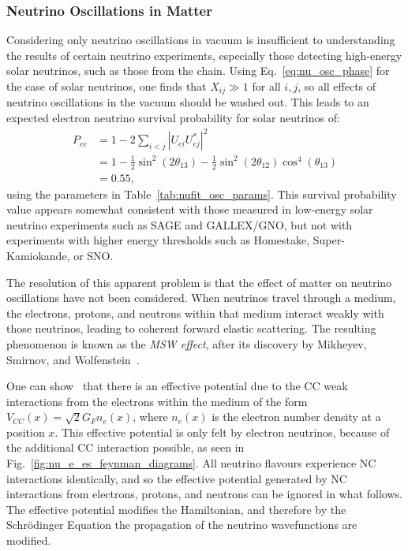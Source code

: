 \subsubsection{Neutrino Oscillations in Matter}
Considering only neutrino oscillations in vacuum is insufficient to understanding the results of certain neutrino experiments, especially those detecting high-energy solar neutrinos, such as those from the \beight{} chain. Using Eq.~\ref{eq:nu_osc_phase} for the case of solar neutrinos, one finds that $X_{ij}\gg 1$ for all $i,j$, so all effects of neutrino oscillations in the vacuum should be washed out. This leads to an expected electron neutrino survival probability for solar neutrinos of:
\begin{align}\label{eq:solar_pee_naive}
    P_{ee}  &= 1 - 2\sum_{i<j}|U_{ei}U_{ej}^{*}|^{2}\\
            &= 1 - \frac{1}{2}\sin^{2}(2\theta_{13}) - \frac{1}{2}\sin^{2}(2\theta_{12})\cos^{4}(\theta_{13})\\
            &= 0.55,
\end{align}
using the parameters in Table~\ref{tab:nufit_osc_params}. This survival probability value appears somewhat consistent with those measured in low-energy solar neutrino experiments such as SAGE and GALLEX/GNO, but not with experiments with higher energy thresholds such as Homestake, Super-Kamiokande, or SNO.

The resolution of this apparent problem is that the effect of matter on neutrino oscillations have not been considered. When neutrinos travel through a medium, the electrons, protons, and neutrons within that medium interact weakly with those neutrinos, leading to coherent forward elastic scattering. The resulting phenomenon is known as the \textit{MSW effect}, after its discovery by Mikheyev, Smirnov, and Wolfenstein~\cite{wolfensteinNeutrinoOscillationsMatter1978,mikheyevResonantAmplificationOscillations1986}. %

One can show~\cite{giuntiChapterNeutrinoOscillations2007} that there is an effective potential due to the CC weak interactions from the electrons within the medium of the form $V_{CC}(x) = \sqrt{2}G_{F}n_{e}(x)$, where $n_{e}(x)$ is the electron number density at a position $x$. This effective potential is only felt by electron neutrinos, because of the additional CC interaction possible, as seen in Fig.~\ref{fig:nu_e_es_feynman_diagrams}. All neutrino flavours experience NC interactions identically, and so the effective potential generated by NC interactions from electrons, protons, and neutrons can be ignored in what follows. The effective potential modifies the Hamiltonian, and therefore by the Schr\"{o}dinger Equation the propagation of the neutrino wavefunctions are modified.

